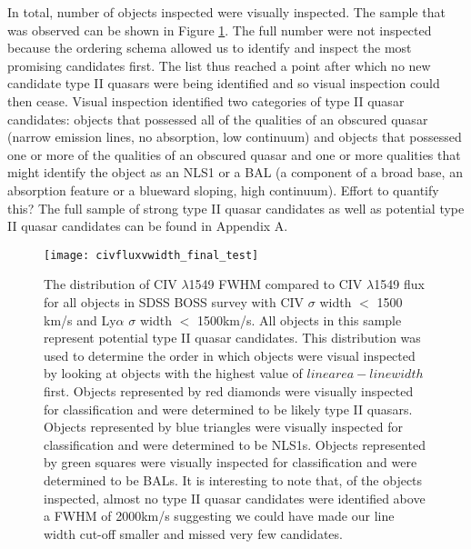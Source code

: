\documentclass[preprint]{aastex}
\begin{document}
In total, \color{red} number of objects inspected \color{black} were visually inspected.  The sample that was observed can be shown in Figure \ref{fig:civfluxvwidth}. The full number were not inspected because the ordering schema allowed us to identify and inspect the most promising candidates first.  The list thus reached a point after which no new candidate type II quasars were being identified and so visual inspection could then cease.  Visual inspection identified two categories of type II quasar candidates: objects that possessed all of the qualities of an obscured quasar (narrow emission lines, no absorption, low continuum) and objects that possessed one or more of the qualities of an obscured quasar and one or more qualities that might identify the object as an NLS1 or a BAL (a component of a broad base, an absorption feature or a blueward sloping, high continuum). \color{red}Effort to quantify this?\color{black}  The full sample of strong type II quasar candidates as well as potential type II quasar candidates can be found in Appendix A.

\begin{figure}
\begin{center}
\texttt{[image: civfluxvwidth\_final\_test]}
\end{center}
\caption{The distribution of CIV $\lambda$1549 FWHM compared to CIV $\lambda$1549 flux for all objects in SDSS BOSS survey with CIV $\sigma$ width $<$ 1500 km/s and Ly$\alpha$ $\sigma$ width $<$ 1500km/s.  All objects in this sample represent potential type II quasar candidates.  This distribution was used to determine the order in which objects were visual inspected by looking at objects with the highest value of $line area - line width$ first.  Objects represented by red diamonds were visually inspected for classification and were determined to be likely type II quasars.  Objects represented by blue triangles were visually inspected for classification and were determined to be NLS1s.  Objects represented by green squares were visually inspected for classification and were determined to be BALs. It is interesting to note that, of the objects inspected, almost no type II quasar candidates were identified above a FWHM of 2000km/s suggesting we could have made our line width cut-off smaller and missed very few candidates.}
\label{fig:civfluxvwidth}
\end{figure}
\end{document}
